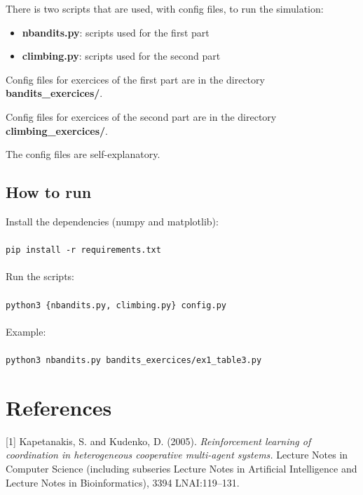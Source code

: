 \documentclass[letterpaper]{article}
\begin{document}
There is two scripts that are used, with config files, to run the
simulation:

\begin{itemize}
  \item \textbf{nbandits.py}: scripts used for the first part
  \item \textbf{climbing.py}: scripts used for the second part
\end{itemize}

Config files for exercices of the first part are in the directory
\textbf{bandits\_exercices/}.

Config files for exercices of the second part are in the directory
\textbf{climbing\_exercices/}.

The config files are self-explanatory.
\subsection{How to run}

Install the dependencies (numpy and matplotlib): \\ \\
\texttt{pip install -r requirements.txt}
\\ \\
Run the scripts: \\ \\
\texttt{python3 \{nbandits.py, climbing.py\} config.py}
\\ \\
Example: \\ \\
\texttt{python3 nbandits.py bandits\_exercices/ex1\_table3.py}

\section*{References}

[1] Kapetanakis, S. and Kudenko, D. (2005).
\textit{Reinforcement
learning of coordination in heterogeneous cooperative multi-agent systems.}
Lecture Notes in
Computer Science
(including subseries Lecture Notes in Artificial Intelligence and Lecture
Notes in Bioinformatics), 3394 LNAI:119–131.
\end{document}
